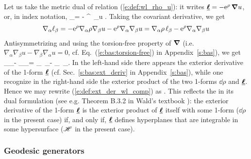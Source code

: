 Let us take the metric dual of relation (\ref{e:def:wl_rho_u}): it writes
$\underline{\bm{\ell}} = - \mathrm{e}^\rho \, \bm{\nabla} u$, or, in index notation,
\be
    \el_\alpha = - ^\rho \, \nabla_\alpha u .
\ee
Taking the covariant derivative, we get
\[
    \nabla_\alpha \ell_\beta = - \mathrm{e}^\rho \nabla_\alpha \rho \nabla_\beta u
                -   \mathrm{e}^\rho  \nabla_\alpha \nabla_\beta u
                 = \nabla_\alpha \rho \, \ell_\beta - \mathrm{e}^\rho  \nabla_\alpha \nabla_\beta u
\]
Antisymmetrizing and using the torsion-free property of $\bm{\nabla}$ (i.e.
$\nabla_\alpha \nabla_\beta u - \nabla_\beta \nabla_\alpha u = 0$, cf.
Eq.~(\ref{e:bas:torsion-free}) in Appendix~\ref{s:bas}), we get
\be \label{e:def:ext_der_wl_comp}
  \nabla_\alpha \el_\beta - \nabla_\beta \el_\alpha =
  \nabla_\alpha \rho \, \el_\beta -  \nabla_\beta \rho \, \el_\alpha  .
\ee
In the left-hand side there appears the exterior derivative of
the 1-form $\underline{\bm{\ell}}$ (cf. Sec.~\ref{s:bas:ext_deriv} in Appendix~\ref{s:bas}),
while one recognize in the right-hand side the exterior product of
the two 1-forms $\dd\rho$ and $\underline{\bm{\ell}}$. Hence we may rewrite (\ref{e:def:ext_der_wl_comp})
as
\be
    \encadre{ \dd \uu{\el} = \dd\rho \wedge \uu{\el} } .
\ee
This reflects the 
in its dual formulation (see e.g.
Theorem B.3.2 in Wald's textbook \cite{Wald84}): the exterior derivative of
the 1-form $\underline{\bm{\ell}}$ is the exterior product of $\underline{\bm{\ell}}$ itself with some
1-form ($\dd\rho$ in the present case) if, and only if,
$\underline{\bm{\ell}}$ defines hyperplanes that are integrable in some hypersurface ($\mathscr{H}$ in the present case).

\subsubsection{Geodesic generators} \label{s:def:geod_gener}

